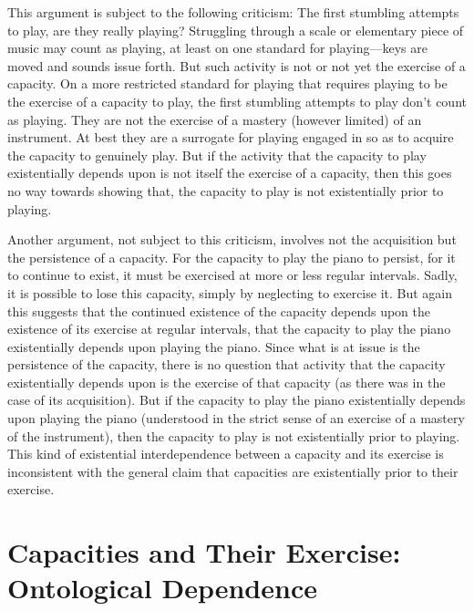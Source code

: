 \documentclass[12pt]{article}
\begin{document}
This argument is subject to the following criticism: The first stumbling attempts to play, are they really playing? Struggling through a scale or elementary piece of music may count as playing, at least on one standard for playing---keys are moved and sounds issue forth. But such activity is not or not yet the exercise of a capacity. On a more restricted standard for playing that requires playing to be the exercise of a capacity to play, the first stumbling attempts to play don't count as playing. They are not the exercise of a mastery (however limited) of an instrument. At best they are a surrogate for playing engaged in so as to acquire the capacity to genuinely play. But if the activity that the capacity to play existentially depends upon is not itself the exercise of a capacity, then this goes no way towards showing that, the capacity to play is not existentially prior to playing.

Another argument, not subject to this criticism, involves not the acquisition but the persistence of a capacity. For the capacity to play the piano to persist, for it to continue to exist, it must be exercised at more or less regular intervals. Sadly, it is possible to lose this capacity, simply by neglecting to exercise it. But again this suggests that the continued existence of the capacity depends upon the existence of its exercise at regular intervals, that the capacity to play the piano existentially depends upon playing the piano. Since what is at issue is the persistence of the capacity, there is no question that activity that the capacity existentially depends upon is the exercise of that capacity (as there was in the case of its acquisition). But if the capacity to play the piano existentially depends upon playing the piano (understood in the strict sense of an exercise of a mastery of the instrument), then the capacity to play is not existentially prior to playing. This kind of existential interdependence between a capacity and its exercise is inconsistent with the general claim that capacities are existentially prior to their exercise.


\section{Capacities and Their Exercise: Ontological Dependence} %
\label{sec:capacities_and_their_exercise_ontological_dependence}
\end{document}
